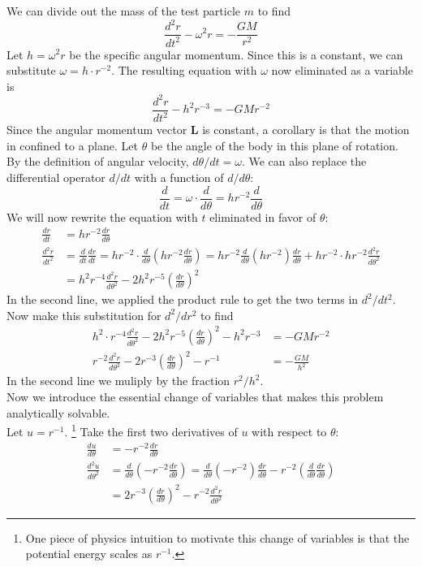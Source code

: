 We can divide out the mass of the test particle $m$ to find
$$ \frac{d^2r}{dt^2} - \omega^2 r = - \frac{G M }{r^2}$$
Let $h = \omega^2 r$ be the specific angular momentum.
Since this is a constant, we can substitute $\omega = h\cdot r^{-2}$.  
The resulting equation with $\omega$ now eliminated as a variable is
$$ \frac{d^2r}{dt^2} - h^2 r^{-3} = - G Mr^{-2}$$
Since the angular momentum vector $\mathbf{L}$ is constant, a corollary is that the motion in confined to a plane.
Let $\theta$ be the angle of the body in this plane of rotation.
By the definition of angular velocity, $d\theta / dt = \omega$.
We can also replace the differential operator $d / dt$ with a function of $d / d\theta$:
$$\frac{d}{dt} = \omega \cdot \frac{d}{d\theta} = h r^{-2} \frac{d}{d\theta}$$
We will now rewrite the equation with $t$ eliminated in favor of $\theta$:
\begin{align*}
\frac{dr}{dt} &= hr^{-2} \frac{dr}{d\theta} \\
\frac{d^2r}{dt^2} &= \frac{d}{dt} \frac{dr}{dt} = hr^{-2} \cdot \frac{d}{d\theta} \left( hr^{-2} \frac{dr}{d\theta} \right)
= hr^{-2} \frac{d}{d\theta} \left(hr^{-2}\right) \frac{dr}{d\theta}  + hr^{-2} \cdot hr^{-2} \frac{d^2r}{d\theta^2} \\
&= h^2 r^{-4} \frac{d^2r}{d\theta^2} - 2h^2 r^{-5} \left( \frac{dr}{d\theta} \right)^2
\end{align*}
In the second line, we applied the product rule to get the two terms in $d^2 / dt^2$.\\
Now make this substitution for $d^2/ dr^2$ to find
\begin{align*}
h^2 \cdot r^{-4} \frac{d^2r}{d\theta^2} - 2h^2 r^{-5} \left(\frac{dr}{d\theta}\right)^2 - h^2r^{-3} &= -GMr^{-2} \\
r^{-2} \frac{d^2r}{d\theta^2} - 2 r^{-3} \left(\frac{dr}{d\theta}\right)^2 - r^{-1} &= -\frac{GM}{h^2}
\end{align*}
In the second line we muliply by the fraction $r^2 / h^2$.\\
Now we introduce the essential change of variables that makes this problem analytically solvable.\\
Let $u = r^{-1}$.  
\footnote{One piece of physics intuition to motivate this change of variables is that the potential energy scales as $r^{-1}$.}
Take the first two derivatives of $u$ with respect to $\theta$:
\begin{align*}
\frac{du}{d\theta} &= -r^{-2} \frac{dr}{d\theta} \\
\frac{d^2u}{d\theta^2} &= \frac{d}{d\theta} \left( -r^{-2} \frac{dr}{d\theta} \right) = 
\frac{d}{d\theta} \left( -r^{-2} \right)\frac{dr}{d\theta} -r^{-2} \left( \frac{d}{d\theta}   \frac{dr}{d\theta} \right) \\
&= 2r^{-3} \left(\frac{dr}{d\theta}\right)^{2} - r^{-2} \frac{d^2r}{d\theta^2}
\end{align*}
